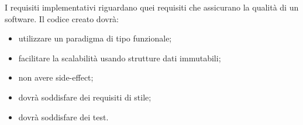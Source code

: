 I requisiti implementativi riguardano quei requisiti che assicurano la qualità di un software.
Il codice creato dovrà:
\begin{itemize}
	\item utilizzare un paradigma di tipo funzionale;
	\item facilitare la scalabilità usando strutture dati immutabili;
	\item non avere side-effect;
	\item dovrà soddisfare dei requisiti di stile;
	\item dovrà soddisfare dei test.
\end{itemize}